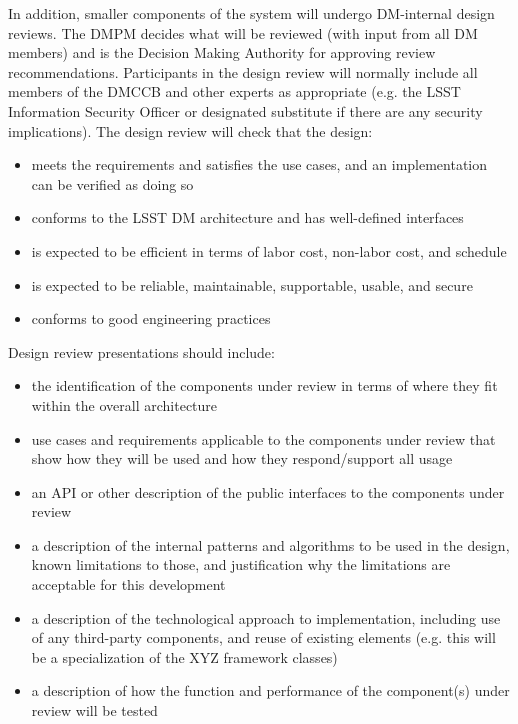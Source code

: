 
In addition, smaller components of the system will undergo DM-internal design reviews.  The DMPM decides what will be reviewed (with input from all DM members) and is the Decision Making Authority for approving review recommendations.  Participants in the design review will normally include all members of the DMCCB and other experts as appropriate (e.g. the LSST Information Security Officer or designated substitute if there are any security implications).  The design review will check that the design:
\begin{itemize}
\item meets the requirements and satisfies the use cases, and an implementation can be verified as doing so
\item conforms to the LSST DM architecture and has well-defined interfaces
\item is expected to be efficient in terms of labor cost, non-labor cost, and schedule
\item is expected to be reliable, maintainable, supportable, usable, and secure
\item conforms to good engineering practices
\end{itemize}

Design review presentations should include:
\begin{itemize}
\item the identification of the components under review in terms of where they fit within the overall architecture
\item use cases and requirements applicable to the components under review that show how they will be used and how they respond/support all usage
\item an API or other description of the public interfaces to the components under review
\item a description of the internal patterns and algorithms to be used in the design, known limitations to those, and justification why the limitations are acceptable for this development
\item a description of the technological approach to implementation, including use of any third-party components, and reuse of existing elements (e.g. this will be a specialization of the XYZ framework classes)
\item a description of how the function and performance of the component(s) under review will be tested
\end{itemize}
